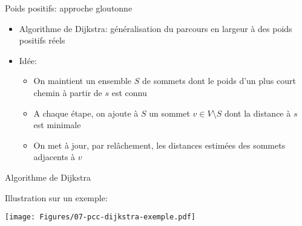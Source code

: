 \begin{frame}{Poids positifs: approche gloutonne}

\begin{itemize}
\item Algorithme de Dijkstra: généralisation du parcours en largeur à
  des poids positifs réels

\bigskip

\item Idée:
\begin{itemize}
\item On maintient un ensemble $S$ de sommets dont le poids d'un plus
  court chemin à partir de $s$ est connu
\item A chaque étape, on ajoute à $S$ un sommet $v\in V\setminus S$ dont la distance à $s$ est minimale
\item On met à jour, par relâchement, les distances estimées des sommets adjacents à $v$
\end{itemize}
\end{itemize}

\end{frame}

\begin{frame}{Algorithme de Dijkstra}

\begin{center}
{\small
{}
}
\end{center}

\bigskip

Illustration sur un exemple:\vspace{-0.5cm}
\centerline{\texttt{[image: Figures/07-pcc-dijkstra-exemple.pdf]}}

\end{frame}


